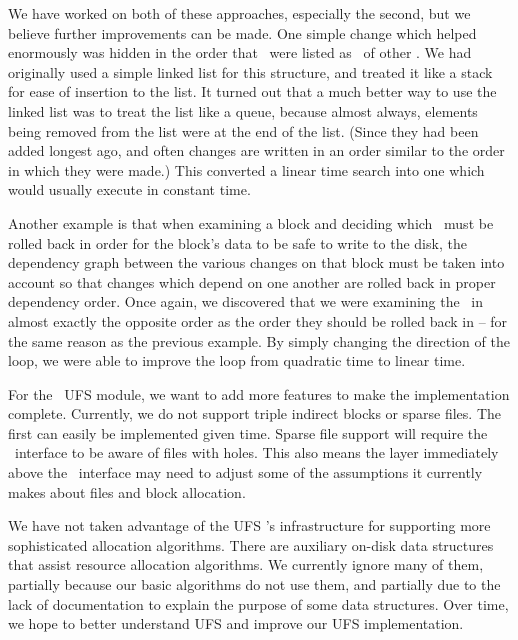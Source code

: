 We have worked on both of these approaches, especially the second, but we
believe further improvements can be made. One simple change which helped
enormously was hidden in the order that \chdescs\ were listed as \befores\ of
other \chdescs. We had originally used a simple linked list for this structure,
and treated it like a stack for ease of insertion to the list. It turned out
that a much better way to use the linked list was to treat the list like a
queue, because almost always, elements being removed from the list were at the
end of the list. (Since they had been added longest ago, and often changes are
written in an order similar to the order in which they were made.) This
converted a linear time search into one which would usually execute in constant
time.

Another example is that when examining a block and deciding which \chdescs\ must
be rolled back in order for the block's data to be safe to write to the disk,
the dependency graph between the various changes on that block must be taken
into account so that changes which depend on one another are rolled back in
proper dependency order. Once again, we discovered that we were examining the
\chdescs\ in almost exactly the opposite order as the order they should be
rolled back in -- for the same reason as the previous example. By simply
changing the direction of the loop, we were able to improve the loop from
quadratic time to linear time.

For the \Kudos\ UFS module, we want to add more features to make the
implementation complete. Currently, we do not support triple indirect blocks or
sparse files. The first can easily be implemented given time. Sparse file
support will require the \LFS\ interface to be aware of files with holes. This
also means the layer immediately above the \LFS\ interface may need to adjust
some of the assumptions it currently makes about files and block allocation.

We have not taken advantage of the UFS \module's infrastructure for supporting
more sophisticated allocation algorithms. There are auxiliary on-disk data
structures that assist resource allocation algorithms. We currently ignore many
of them, partially because our basic algorithms do not use them, and partially
due to the lack of documentation to explain the purpose of some data structures.
Over time, we hope to better understand UFS and improve our UFS implementation.

